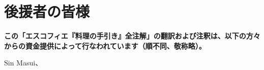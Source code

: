 \hypertarget{benefactors}{%
\section{後援者の皆様}\label{benefactors}}

\thispagestyle{empty}

\textbf{この「エスコフィエ『料理の手引き』全注解」の翻訳および注釈は、以下の方々からの資金提供によって行なわれています（順不同、敬称略）。}

Sin Masui、
